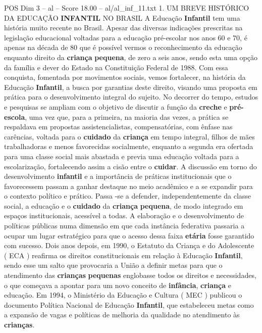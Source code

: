 \begin{textsample}{POS Dim 3 – al – Score 18.00 – al/al\_inf\_11.txt}  \label{ex:f3_pos_216}
1.
UM BREVE HISTÓRICO DA EDUCAÇÃO \textbf{INFANTIL} NO BRASIL A Educação \textbf{Infantil} tem uma história muito recente no Brasil.
Apesar das diversas indicações prescritas na legislação educacional voltadas para a educação pré-escolar nos anos 60 e 70, é apenas na década de 80 que é possível vermos o reconhecimento da educação enquanto direito da \textbf{criança} \textbf{pequena}, de zero a seis anos, sendo esta uma opção da família e dever do Estado na Constituição Federal de 1988.
Com essa conquista, fomentada por movimentos sociais, vemos fortalecer, na história da Educação \textbf{Infantil}, a busca por garantias deste direito, visando uma proposta em prática para o desenvolvimento integral do sujeito.
No decorrer do tempo, estudos e pesquisas se ampliam com o objetivo de discutir a função da \textbf{creche} e \textbf{pré-escola}, uma vez que, para a primeira, na maioria das vezes, a prática se respaldava em propostas assistencialistas, compensatórias, com ênfase nas carências, voltada para o \textbf{cuidado} da \textbf{criança} em tempo integral, filhos de mães trabalhadoras e menos favorecidas socialmente, enquanto a segunda era ofertada para uma classe social mais abastada e previa uma educação voltada para a escolarização, fortalecendo assim a cisão entre o \textbf{cuidar}.
A discussão em torno do desenvolvimento \textbf{infantil} e a importância de práticas institucionais que o favorecessem passam a ganhar destaque no meio acadêmico e a se expandir para o contexto político e prático.
Passa -se a defender, independentemente da classe social, a educação e o \textbf{cuidado} da \textbf{criança} \textbf{pequena}, de modo integrado em espaços institucionais, acessível a todas.
A elaboração e o desenvolvimento de políticas públicas numa dimensão em que cada instância federativa passaria a ocupar um lugar estratégico para que o acesso dessa faixa \textbf{etária} fosse garantido com sucesso.
Dois anos depois, em 1990, o Estatuto da Criança e do Adolescente ( ECA ) reafirma os direitos constitucionais em relação à Educação \textbf{Infantil}, sendo esse um salto que provocaria a União a definir metas para que o atendimento das \textbf{crianças} \textbf{pequenas} englobasse todos os direitos e necessidades, o que começava a apontar para um novo conceito de \textbf{infância}, \textbf{criança} e educação.
Em 1994, o Ministério da Educação e Cultura ( MEC ) publicou o documento Política Nacional de Educação \textbf{Infantil}, que estabeleceu metas como a expansão de vagas e políticas de melhoria da qualidade no atendimento às \textbf{crianças}.

\end{textsample}
